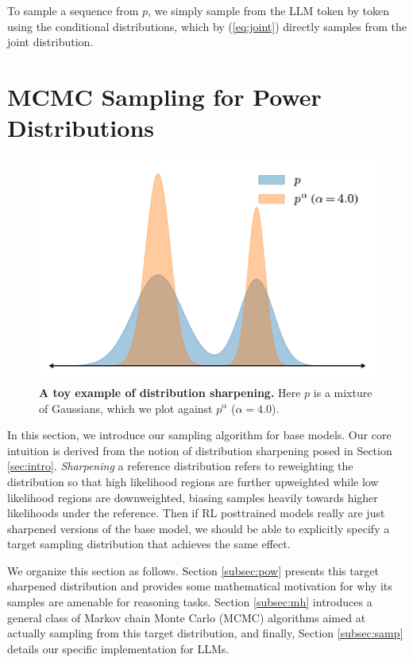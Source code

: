 \documentclass{article}
\begin{document}
To sample a sequence from $p$, we simply sample from the LLM token by token using the conditional distributions, which by (\ref{eq:joint}) directly samples from the joint distribution. 

\newpage

\section{MCMC Sampling for Power Distributions}

\begin{figure}
  \centering
  \includegraphics[width=\linewidth]{toy_sharp.pdf}
  \captionsetup{font=small}
  \caption{\textbf{A toy example of distribution sharpening.} Here $p$ is a mixture of Gaussians, which we plot against $p^{\alpha}$ ($\alpha = 4.0$).}
  \label{fig:toy}
  \vspace{-15pt}
\end{figure}


In this section, we introduce our sampling algorithm for base models. Our core intuition is derived from the notion of distribution sharpening posed in Section \ref{sec:intro}. \textit{Sharpening} a reference distribution refers to reweighting the distribution so that high likelihood regions are further upweighted while low likelihood regions are downweighted, biasing samples heavily towards higher likelihoods under the reference. Then if RL posttrained models really are just sharpened versions of the base model, we should be able to explicitly specify a target sampling distribution that achieves the same effect.

We organize this section as follows. Section \ref{subsec:pow} presents this target sharpened distribution and provides some mathematical motivation for why its samples are amenable for reasoning tasks. Section \ref{subsec:mh} introduces a general class of Markov chain Monte Carlo (MCMC) algorithms aimed at actually sampling from this target distribution, and finally, Section \ref{subsec:samp} details our specific implementation for LLMs.
\end{document}
